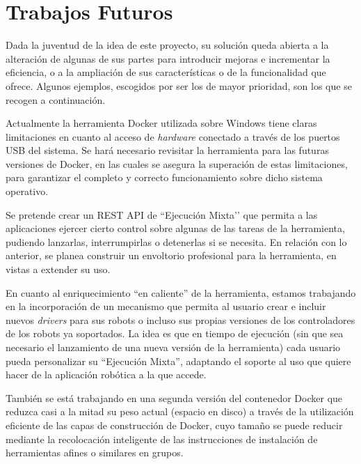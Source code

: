 \section{Trabajos Futuros}
Dada la juventud de la idea de este proyecto, su solución queda abierta a la alteración de algunas de sus partes para introducir mejoras e incrementar la eficiencia, o a la ampliación de sus características o de la funcionalidad que ofrece. Algunos ejemplos, escogidos por ser los de mayor prioridad, son los que se recogen a continuación.

Actualmente la herramienta Docker utilizada sobre Windows tiene claras limitaciones en cuanto al acceso de \textit{hardware} conectado a través de los puertos USB del sistema. Se hará necesario revisitar la herramienta para las futuras versiones de Docker, en las cuales se asegura la superación de estas limitaciones, para garantizar el completo y correcto funcionamiento sobre dicho sistema operativo.

Se pretende crear un REST API de ``Ejecución Mixta’’ que permita a las aplicaciones ejercer cierto control sobre algunas de las tareas de la herramienta, pudiendo lanzarlas, interrumpirlas o detenerlas si se necesita.
En relación con lo anterior, se planea construir un envoltorio profesional para la herramienta, en vistas a extender su uso.

En cuanto al enriquecimiento ``en caliente'' de la herramienta, estamos trabajando en la incorporación de un mecanismo que permita al usuario crear e incluir nuevos \textit{drivers} para sus robots o incluso sus propias versiones de los controladores de los robots ya soportados. La idea es que en tiempo de ejecución (sin que sea necesario el lanzamiento de una nueva versión de la herramienta) cada usuario pueda personalizar su ``Ejecución Mixta'', adaptando el soporte al uso que quiere hacer de la aplicación robótica a la que accede.

También se está trabajando en una segunda versión del contenedor Docker que reduzca casi a la mitad su peso actual (espacio en disco) a través de la utilización eficiente de las capas de construcción de Docker, cuyo tamaño se puede reducir mediante la recolocación inteligente de las instrucciones de instalación de herramientas afines o similares en grupos.
